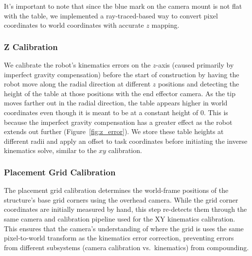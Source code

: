 \noindent It's important to note that since the blue mark on the camera mount is not flat with the table, we implemented a ray-traced-based way to convert pixel coordinates to world coordinates with accurate $z$ mapping.

\subsubsection{Z Calibration}
\label{sec:z_calib}
We calibrate the robot's kinematics errors on the $z$-axis (caused primarily by imperfect gravity compensation) before the start of construction by having the robot move along the radial direction at different $z$ positions and detecting the height of the table at those positions with the end effector camera. As the tip moves farther out in the radial direction, the table appears higher in world coordinates even though it is meant to be at a constant height of 0. This is because the imperfect gravity compensation has a greater effect as the robot extends out further (Figure~\ref{fig:z_error}). We store these table heights at different radii and apply an offset to task coordinates before initiating the inverse kinematics solve, similar to the $xy$ calibration.

\subsubsection{Placement Grid Calibration}
The placement grid calibration determines the world-frame positions of the structure's base grid corners using the overhead camera. While the grid corner coordinates are initially measured by hand, this step re-detects them through the same camera and calibration pipeline used for the XY kinematics calibration. This ensures that the camera's understanding of where the grid is uses the same pixel-to-world transform as the kinematics error correction, preventing errors from different subsystems (camera calibration vs.\ kinematics) from compounding.

